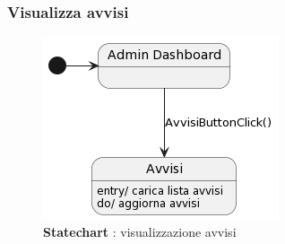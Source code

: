     \subsubsection{Visualizza avvisi}
        \begin{figure}[H]
            \centering
            \includegraphics[scale=1]{assets/diagrammi/Statechart/visualizzaAvvisi.png}
            \caption*{\textbf{Statechart} : visualizzazione avvisi}\label{fig:Statechart_viewAdv}
        \end{figure}